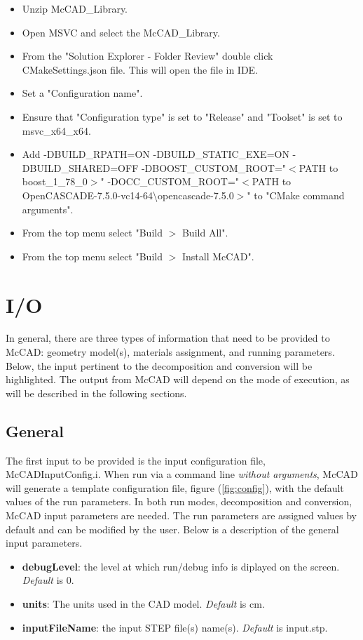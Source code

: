 \documentclass[letterpaper, 12 pt]{report}
\begin{document}
\begin{itemize}
\begin{itemize}
		\item Unzip McCAD\_Library.
		\item Open MSVC and select the McCAD\_Library.
		\item From the "Solution Explorer - Folder Review" double click CMakeSettings.json file. This will open the file in IDE. \item Set a "Configuration name". 
		\item Ensure that "Configuration type" is set to "Release" and "Toolset" is set to msvc\_x64\_x64.
		\item Add -DBUILD\_RPATH=ON -DBUILD\_STATIC\_EXE=ON -DBUILD\_SHARED=OFF -DBOOST\_CUSTOM\_ROOT="$<$PATH to boost\_1\_78\_0$>$" -DOCC\_CUSTOM\_ROOT="$<$PATH to OpenCASCADE-7.5.0-vc14-64\textbackslash opencascade-7.5.0$>$" to "CMake command arguments".
		\item From the top menu select "Build $>$ Build All".
		\item From the top menu select "Build $>$ Install McCAD".
	  \end{itemize}
    \end{itemize}

\section{I/O} \label{sec:I/O}
In general, there are three types of information that need to be provided to McCAD: geometry model(s), materials assignment, and running parameters. Below, the input pertinent to the decomposition and conversion will be highlighted. The output from McCAD will depend on the mode of execution, as will be described in the following sections.
  \subsection{General}
	The first input to be provided is the input configuration file, McCADInputConfig.i.  When run via a command line \emph{without arguments}, McCAD will generate a template configuration file, figure (\ref{fig:config}), with the default values of the run parameters. In both run modes, decomposition and conversion, McCAD input parameters are needed. The run parameters are assigned values by default and can be modified by the user. Below is a description of the general input parameters.
	\begin{itemize}
		\item \textbf{debugLevel}: the level at which run/debug info is diplayed on the screen. \emph{Default} is 0.
		\item \textbf{units}: The units used in the CAD model. \emph{Default} is cm.
		\item \textbf{inputFileName}: the input STEP file(s) name(s). \emph{Default} is input.stp.
	\end{itemize}
\end{document}
